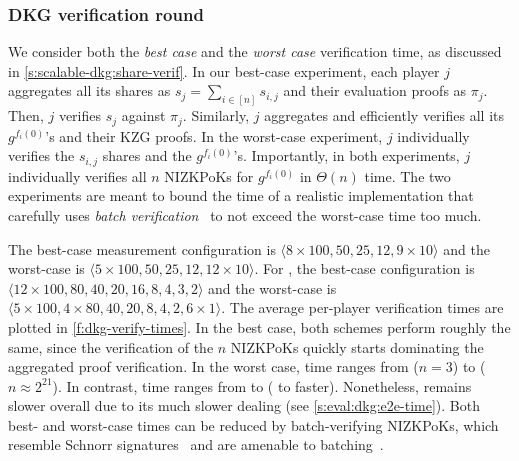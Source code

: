 \subsubsection{DKG verification round}
\label{s:eval:dkg:share-verif}
We consider both the \textit{best case} and the \textit{worst case} verification time, as discussed in \cref{s:scalable-dkg:share-verif}.
In our best-case experiment, each player $j$ aggregates all its shares as $s_j=\sum_{i\in[n]} s_{i,j}$ and their evaluation proofs as $\pi_j$.
Then, $j$ verifies $s_j$ against $\pi_j$.
Similarly, $j$ aggregates and efficiently verifies all its $g^{f_i(0)}$'s and their KZG proofs.
In the worst-case experiment, $j$ individually verifies the $s_{i,j}$ shares and the $g^{f_i(0)}$'s.
Importantly, in both experiments, $j$ individually verifies all $n$ NIZKPoKs for $g^{f_i(0)}$ in $\Theta(n)$ time.
The two experiments are meant to bound the time of a realistic implementation that carefully uses \textit{batch verification}~\cite{Boldyreva2003Threshold,LM07} to not exceed the worst-case time too much.

The best-case \ejfdkg measurement configuration is $\langle 8 \times 100, 50, 25, 12, 9 \times 10\rangle$ and the worst-case is $\langle 5 \times 100, 50, 25, 12, 12\times 10 \rangle$.
For \ourdkg, the best-case configuration is $\langle 12\times 100, 80, 40, 20, 16, 8, 4, 3, 2 \rangle$ and the worst-case is $\langle 5 \times 100, 4\times 80, 40, 20, 8, 4, 2, 6\times 1 \rangle$.
The average per-player verification times are plotted in \cref{f:dkg-verify-times}.
In the best case, both schemes perform roughly the same, since the verification of the $n$ NIZKPoKs quickly starts dominating the aggregated proof verification.
In the worst case, \ourdkg time ranges from  ($n=3$) to  ($n \approx 2^{21}$).
In contrast, \ejfdkg time ranges from  to  ( to  faster).
Nonetheless, \ejfdkg remains slower overall due to its much slower dealing (see \cref{s:eval:dkg:e2e-time}).
Both best- and worst-case times can be reduced by batch-verifying NIZKPoKs, which resemble Schnorr signatures~\cite{Schnorr89} and are amenable to batching~\cite{BDL+12}.

